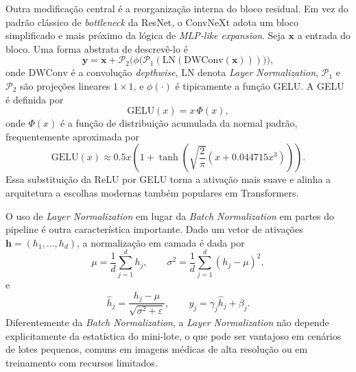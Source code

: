 \documentclass[tcc,capa]{texufpel}
\begin{document}
Outra modificação central é a reorganização interna do bloco residual. Em vez do padrão clássico de \textit{bottleneck} da ResNet, o ConvNeXt adota um bloco simplificado e mais próximo da lógica de \textit{MLP-like expansion}. Seja \(\mathbf{x}\) a entrada do bloco. Uma forma abstrata de descrevê-lo é
\begin{equation}
	\mathbf{y}
	=
	\mathbf{x}
	+
	\mathcal{P}_2
	\Big(
	\phi\big(
	\mathcal{P}_1(
	\mathrm{LN}(\mathrm{DWConv}(\mathbf{x}))
	)
	\big)
	\Big),
\end{equation}
onde \(\mathrm{DWConv}\) é a convolução \textit{depthwise}, \(\mathrm{LN}\) denota \textit{Layer Normalization}, \(\mathcal{P}_1\) e \(\mathcal{P}_2\) são projeções lineares \(1\times 1\), e \(\phi(\cdot)\) é tipicamente a função GELU. A GELU é definida por
\begin{equation}
	\mathrm{GELU}(x) = x\,\Phi(x),
\end{equation}
onde \(\Phi(x)\) é a função de distribuição acumulada da normal padrão, frequentemente aproximada por
\begin{equation}
	\mathrm{GELU}(x)
	\approx
	0.5x\left(1+\tanh\left(\sqrt{\frac{2}{\pi}}\left(x+0.044715x^3\right)\right)\right).
\end{equation}
Essa substituição da ReLU por GELU torna a ativação mais suave e alinha a arquitetura a escolhas modernas também populares em Transformers.

O uso de \textit{Layer Normalization} em lugar da \textit{Batch Normalization} em partes do pipeline é outra característica importante. Dado um vetor de ativações \(\mathbf{h}=(h_1,\dots,h_d)\), a normalização em camada é dada por
\begin{equation}
	\mu = \frac{1}{d}\sum_{j=1}^{d} h_j,
	\qquad
	\sigma^2 = \frac{1}{d}\sum_{j=1}^{d}(h_j-\mu)^2,
\end{equation}
e
\begin{equation}
	\hat{h}_j = \frac{h_j - \mu}{\sqrt{\sigma^2+\varepsilon}},
	\qquad
	y_j = \gamma_j \hat{h}_j + \beta_j.
\end{equation}
Diferentemente da \textit{Batch Normalization}, a \textit{Layer Normalization} não depende explicitamente da estatística do mini-lote, o que pode ser vantajoso em cenários de lotes pequenos, comuns em imagens médicas de alta resolução ou em treinamento com recursos limitados.
\end{document}
